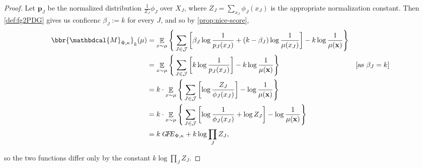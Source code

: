 \documentclass[letterpaper]{article} %
\theoremstyle{plain}
\theoremstyle{definition}
\theoremstyle{remark}
\DeclareMathOperator*{\Ex}{\mathbb{E}} %
\newcommand\mat[1]{\mathbf{#1}}
\newcommand{\dg}[1]{\mathbdcal{#1}}
\newcommand{\PDGof}[1]{{\dg M}_{#1}}
\newcommand\GFE{\mathit{G\mkern-4mu F\mkern-4.5mu E}}
\begin{document}
\begin{proof}
Let $\mat p_J$ be the normalized distribution $\frac{1}{Z_J}\phi_J$ over $X_J$,
where $Z_J = \sum_{x_J} \phi_J(x_J)$ is the appropriate normalization constant. Then
\cref{def:fg2PDG} gives us conficenc $\beta_J := k$ for every $J$, and so by \cref{prop:nice-score},
	\begin{align*}
	\bbr{\PDGof{\Phi,\kappa}}_k(\mu) &= \Ex_{ x \sim \mu} \Bigg\{   \sum_{ J \in \mathcal J } \left[
		\beta_J \log \frac{1}{ p_J(x_J) } + (k -
 	\beta_J
		  ) \log \frac{1}{\mu(x_J)} \right] - k \log \frac{1}{\mu(\mat x)} \Bigg\} \\
		&= \Ex_{ x \sim \mu} \Bigg\{  \sum_{ J \in \mathcal J }\left[
			k \log \frac{1}{p_J(x_J)}  \right] - k \log \frac{1}{\mu(\mat x)} \Bigg\} 
			&\text{[as $\beta_J = k$]}\\
		&= k \cdot \Ex_{x \sim \mu} \Bigg\{  \sum_{ J \in \mathcal J } \left[
			\log \frac{Z_J}{\phi_J(x_J)}  \right] -\log \frac{1}{\mu(\mat x)} \Bigg\} \\
		&= k \cdot \Ex_{x \sim \mu} \Bigg\{  \sum_{ J \in \mathcal J } \left[
			\log \frac{1}{\phi_J(x_J)} + \log Z_J \right]  - \log \frac{1}{\mu(\mat x)} \Bigg\} \\
        	&= k\, \GFE_{\Phi,\kappa} + k \log \prod_{J} Z_J,
	\end{align*}

so the two functions differ only by the constant $k \log \prod_{J} Z_J$. 
\end{proof}
\end{document}
